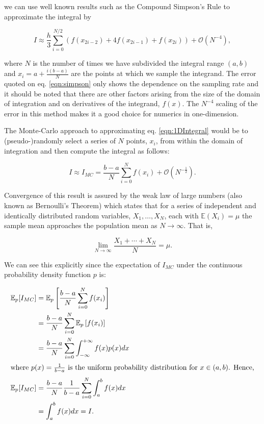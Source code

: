 	we can use well known results such as the Compound Simpson's Rule to approximate the integral by

	\begin{equation}
		I \approx \frac{h}{3}\sum_{i=0}^{N/2}\left(f(x_{2i-2}) + 4f(x_{2i-1}) + f(x_{2i})\right) + \mathcal{O}(N^{-4}),
		\label{eqn:simpson}
	\end{equation}

	where $N$ is the number of times we have subdivided the integral range $(a, b)$ and $x_i = a + \frac{i(b-a)}{N}$ are the points at which we sample the integrand.
	The error quoted on eq. \ref{eqn:simpson} only shows the dependence on the sampling rate and it should be noted that there are other factors arising
	from the size of the domain of integration and on derivatives of the integrand, $f(x)$.  The $N^{-4}$ scaling of the error in this method makes it a good choice
	for numerics in one-dimension.

	The Monte-Carlo approach to approximating eq. \eqref{eqn:1DIntegral} would be to (pseudo-)randomly select a series of $N$ points, $x_i$, from within the domain of integration
	and then compute the integral as follows:

	\begin{equation}
		I \approx I_{MC} = \frac{b-a}{N}\sum_{i=0}^{N}f(x_i) + \mathcal{O}(N^{-\frac{1}{2}}).
	\end{equation}

	Convergence of this result is assured by the weak law of large numbers (also known as Bernoulli's Theorem) which states that for a series of
	independent and identically distributed random variables, ${X_1,\ldots,X_N}$, each with $\mathbb{E}(X_i) = \mu$ the sample mean approaches the population mean as $N\rightarrow\infty$.
	That is,

	\begin{equation}
		\lim_{N\rightarrow\infty}\frac{X_1+\cdots+X_N}{N}=\mu.
	\end{equation}

	We can see this explicitly since the expectation of $I_{MC}$ under the continuous probability density function $p$ is:

	\begin{align*}
		\mathbb{E}_p[I_{MC}] &= \mathbb{E}_p\left[\frac{b-a}{N}\sum_{i=0}^{N}f(x_i)\right]    \\
		                     &= \frac{b-a}{N}\sum_{i=0}^{N}\mathbb{E}_p\left[f(x_i)\right]    \\
		                     &= \frac{b-a}{N}\sum_{i=0}^{N}\int_{-\infty}^{+\infty}f(x)p(x)dx \\
		                     \intertext{where $p(x)=\frac{1}{b-a}$ is the uniform probability distribution for $x\in(a, b)$.  Hence,}
		\mathbb{E}_p[I_{MC}] &= \frac{b-a}{N}\frac{1}{b-a}\sum_{i=0}^{N}\int_{a}^{b}f(x)dx \\
		                     &= \int_{a}^{b}f(x)dx = I.
	\end{align*}


